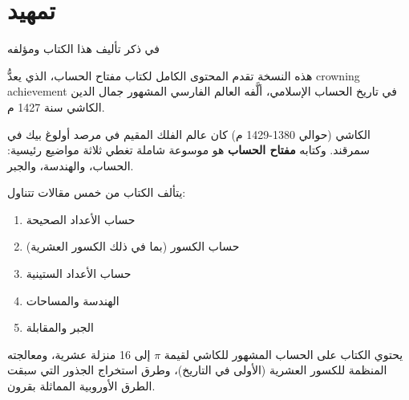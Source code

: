 \documentclass[11pt,a4paper]{book}
\newcommand{\ar}[1]{\arabicfont\beginR #1\endR}
\newcommand{\arLarge}[1]{{\Large\arabicfont\beginR #1\endR}}
\newenvironment{arabicbox}{%
  \begin{framed}
  \begin{minipage}{\linewidth-2\fboxsep-2\fboxrule}
  \setlength{\parindent}{0pt}
  \linespread{1.3}\selectfont
}{%
  \end{minipage}
  \end{framed}
}
\begin{document}
\tableofcontents
\clearpage

\chapter*{\ar{تمهيد}}
\addcontentsline{toc}{chapter}{\ar{تمهيد}}

\begin{arabicbox}
\arLarge{في ذكر تأليف هذا الكتاب ومؤلفه}
\end{arabicbox}

\vspace{0.5cm}

\noindent\ar{هذه النسخة تقدم المحتوى الكامل لكتاب مفتاح الحساب، الذي يعدُّ crowning achievement في تاريخ الحساب الإسلامي، ألَّفه العالم الفارسي المشهور جمال الدين الكاشي سنة 1427 م.}

\vspace{0.3cm}
\noindent\ar{الكاشي (حوالي 1380-1429 م) كان عالم الفلك المقيم في مرصد أولوغ بيك في سمرقند. وكتابه \textbf{مفتاح الحساب} هو موسوعة شاملة تغطي ثلاثة مواضيع رئيسية: الحساب، والهندسة، والجبر.}

\vspace{0.3cm}
\noindent\ar{يتألف الكتاب من خمس مقالات تتناول:}
\begin{enumerate}[nosep]
  \item \ar{حساب الأعداد الصحيحة}
  \item \ar{حساب الكسور (بما في ذلك الكسور العشرية)}
  \item \ar{حساب الأعداد الستينية}
  \item \ar{الهندسة والمساحات}
  \item \ar{الجبر والمقابلة}
\end{enumerate}

\vspace{0.3cm}
\noindent\ar{يحتوي الكتاب على الحساب المشهور للكاشي لقيمة $\pi$ إلى 16 منزلة عشرية، ومعالجته المنظمة للكسور العشرية (الأولى في التاريخ)، وطرق استخراج الجذور التي سبقت الطرق الأوروبية المماثلة بقرون.}
\clearpage

\end{document}
